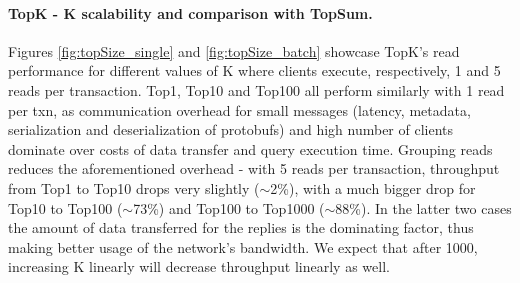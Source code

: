 \documentclass[sigplan,review,anonymous]{acmart}
\begin{document}

\paragraph{TopK - K scalability and comparison with TopSum.} %

Figures \ref{fig:topSize_single} and \ref{fig:topSize_batch} showcase TopK's read performance for different values of K where clients execute, respectively, 1 and 5 reads per transaction.
Top1, Top10 and Top100 all perform similarly with 1 read per txn, as communication overhead for small messages (latency, metadata, serialization and deserialization of protobufs) and high number of clients dominate over costs of data transfer and query execution time.
Grouping reads reduces the aforementioned overhead - with 5 reads per transaction, throughput from Top1 to Top10 drops very slightly ($\sim$2\%), with a much bigger drop for Top10 to Top100 ($\sim$73\%) and Top100 to Top1000 ($\sim$88\%).
In the latter two cases the amount of data transferred for the replies is the dominating factor, thus making better usage of the network's bandwidth.
We expect that after 1000, increasing K linearly will decrease throughput linearly as well.

\end{document}
